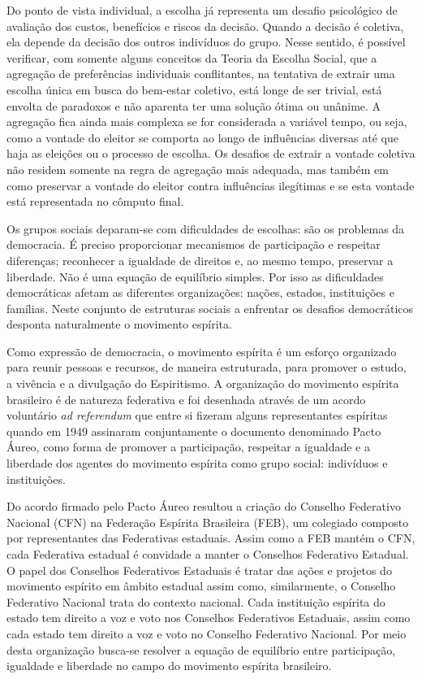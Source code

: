 \begin{citacao}
	Do ponto de vista individual, a escolha já representa um desafio psicológico de avaliação dos custos, benefícios e riscos da decisão. Quando a decisão é coletiva, ela depende da decisão dos outros indivíduos do grupo. Nesse sentido, é possível verificar, com somente alguns conceitos da Teoria da Escolha Social, que a agregação de preferências individuais conflitantes, na tentativa de extrair uma escolha única em busca do bem-estar coletivo, está longe de ser trivial, está envolta de paradoxos e não aparenta ter uma solução ótima ou unânime. A agregação fica ainda mais complexa se for considerada a variável tempo, ou seja, como a vontade do eleitor se comporta ao longo de influências diversas até que haja as eleições ou o processo de escolha. Os desafios de extrair a vontade coletiva não residem somente na regra de agregação mais adequada, mas também em como preservar a vontade do eleitor contra influências ilegítimas e se esta vontade está representada no cômputo final. \cite[p. 45]{rafaelazevedo2014}
\end{citacao}

Os grupos sociais deparam-se com dificuldades de escolhas: são os problemas da democracia. É preciso proporcionar mecanismos de participação e respeitar diferenças; reconhecer a igualdade de direitos e, ao mesmo tempo, preservar a liberdade. Não é uma equação de equilíbrio simples. Por isso as dificuldades democráticas afetam as diferentes organizações: nações, estados, instituições e famílias. Neste conjunto de estruturas sociais a enfrentar os desafios democráticos desponta naturalmente o movimento espírita.

Como expressão de democracia, o movimento espírita é um esforço organizado para reunir pessoas e recursos, de maneira estruturada, para promover o estudo, a vivência e a divulgação do Espiritismo. A organização do movimento espírita brasileiro é de natureza federativa e foi desenhada através de um acordo voluntário \textit{ad referendum} que entre si fizeram alguns representantes espíritas quando em 1949 assinaram conjuntamente o documento denominado Pacto Áureo\cite{pactoaureo2012}, como forma de promover a participação, respeitar a igualdade e a liberdade dos agentes do movimento espírita como grupo social: indivíduos e instituições. 

Do acordo firmado pelo Pacto Áureo resultou a criação do Conselho Federativo Nacional (CFN) na Federação Espírita Brasileira (FEB), um colegiado composto por representantes das Federativas estaduais. Assim como a FEB mantém o CFN, cada Federativa estadual é convidade a manter o Conselhos Federativo Estadual. O papel dos Conselhos Federativos Estaduais é tratar das ações e projetos do movimento espírito em âmbito estadual assim como, similarmente, o Conselho Federativo Nacional trata do contexto nacional. Cada instituição espírita do estado tem direito a voz e voto nos Conselhos Federativos Estaduais, assim como cada estado tem direito a voz e voto no Conselho Federativo Nacional. Por meio desta organização busca-se resolver a equação de equilíbrio entre participação, igualdade e liberdade no campo do movimento espírita brasileiro.

